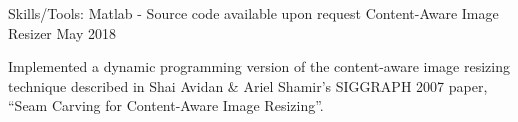 

\begin{cventries}

  \cventry
  {Skills/Tools: Matlab - Source code available upon request} %
  {Content-Aware Image Resizer} %
  {} %
  {May 2018} %
  {
  \begin{cvitems} %
    \item {Implemented a dynamic programming version of the content-aware image resizing technique described in Shai Avidan \& Ariel Shamir’s SIGGRAPH 2007 paper, “Seam Carving for Content-Aware Image Resizing”.}
  \end{cvitems}
  }



\end{cventries}
